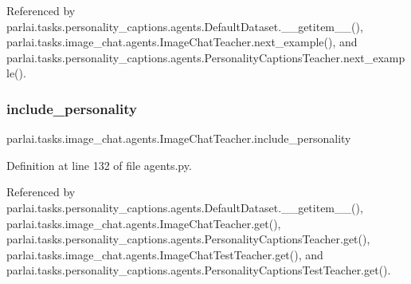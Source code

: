Referenced by parlai.\+tasks.\+personality\+\_\+captions.\+agents.\+Default\+Dataset.\+\_\+\+\_\+getitem\+\_\+\+\_\+(), parlai.\+tasks.\+image\+\_\+chat.\+agents.\+Image\+Chat\+Teacher.\+next\+\_\+example(), and parlai.\+tasks.\+personality\+\_\+captions.\+agents.\+Personality\+Captions\+Teacher.\+next\+\_\+example().

\mbox{\label{classparlai_1_1tasks_1_1image__chat_1_1agents_1_1ImageChatTeacher_aa917cf2e0f8b30c042a1d149aed6d16f}} 
\subsubsection{\texorpdfstring{include\+\_\+personality}{include\_personality}}
{\footnotesize\ttfamily parlai.\+tasks.\+image\+\_\+chat.\+agents.\+Image\+Chat\+Teacher.\+include\+\_\+personality}



Definition at line 132 of file agents.\+py.



Referenced by parlai.\+tasks.\+personality\+\_\+captions.\+agents.\+Default\+Dataset.\+\_\+\+\_\+getitem\+\_\+\+\_\+(), parlai.\+tasks.\+image\+\_\+chat.\+agents.\+Image\+Chat\+Teacher.\+get(), parlai.\+tasks.\+personality\+\_\+captions.\+agents.\+Personality\+Captions\+Teacher.\+get(), parlai.\+tasks.\+image\+\_\+chat.\+agents.\+Image\+Chat\+Test\+Teacher.\+get(), and parlai.\+tasks.\+personality\+\_\+captions.\+agents.\+Personality\+Captions\+Test\+Teacher.\+get().

\mbox{\label{classparlai_1_1tasks_1_1image__chat_1_1agents_1_1ImageChatTeacher_a4cf47d0dacf67e9112521761a8d26318}} 
